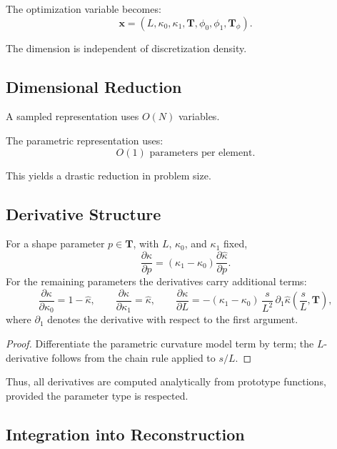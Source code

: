 \begin{definition}
The optimization variable becomes:
\[
\mathbf{x}
=
(L, \kappa_0, \kappa_1, \mathbf{T},
 \phi_0, \phi_1, \mathbf{T}_\phi).
\]
\end{definition}

The dimension is independent of discretization density.


\subsection{Dimensional Reduction}

A sampled representation uses \(O(N)\) variables.

The parametric representation uses:
\[
O(1) \text{ parameters per element}.
\]

This yields a drastic reduction in problem size.


\subsection{Derivative Structure}

\begin{proposition}
\label{prop:parametric-derivative-structure}
For a shape parameter \(p\in\mathbf{T}\), with \(L\), \(\kappa_0\), and
\(\kappa_1\) fixed,
\[
\frac{\partial \kappa}{\partial p}
=
(\kappa_1 - \kappa_0)
\frac{\partial \widehat{\kappa}}{\partial p}.
\]
For the remaining parameters the derivatives carry additional terms:
\[
\frac{\partial \kappa}{\partial \kappa_0}=1-\widehat{\kappa},
\qquad
\frac{\partial \kappa}{\partial \kappa_1}=\widehat{\kappa},
\qquad
\frac{\partial \kappa}{\partial L}
=
-(\kappa_1-\kappa_0)\,\frac{s}{L^2}\,
\partial_1\widehat{\kappa}\!\left(\frac{s}{L},\mathbf{T}\right),
\]
where \(\partial_1\) denotes the derivative with respect to the first
argument.
\end{proposition}

\begin{proof}
Differentiate the parametric curvature model term by term; the
\(L\)-derivative follows from the chain rule applied to \(s/L\).
\end{proof}

Thus, all derivatives are computed analytically from prototype
functions, provided the parameter type is respected.


\subsection{Integration into Reconstruction}

